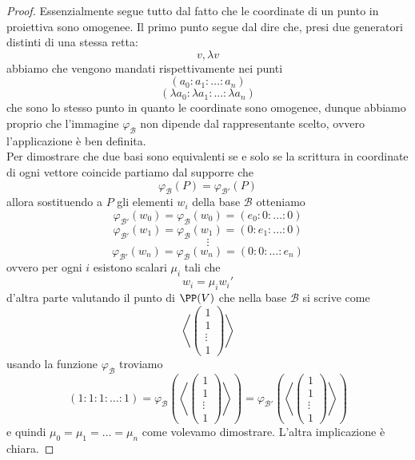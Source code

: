 \documentclass[11pt]{scrartcl}
\begin{document}
   	 \begin{proof}
   	 	Essenzialmente segue tutto dal fatto che le coordinate di un punto in proiettiva sono omogenee. Il primo punto segue dal dire che, presi due generatori distinti di una stessa retta:
   	 	$$v,\lambda v$$
   	 	abbiamo che vengono mandati rispettivamente nei punti
   	 	$$(a_0:a_1:\dots:a_n)$$
   	 	$$\left(\lambda a_0:\lambda a_1:\dots:\lambda a_n\right)$$
   	 	che sono lo stesso punto in quanto le coordinate sono omogenee, dunque abbiamo proprio che l'immagine $\varphi_\mathcal{B}$ non dipende dal rappresentante scelto, ovvero l'applicazione è ben definita. \\
   	 	Per dimostrare che due basi sono equivalenti se e solo se la scrittura in coordinate di ogni vettore coincide partiamo dal supporre che
   	 	$$\varphi_\mathcal{B}(P)=\varphi_{\mathcal{B}'}(P)$$
   	 	allora sostituendo a $P$ gli elementi $w_i$ della base $\mathcal{B}$ otteniamo
   	 	$$\varphi_{\mathcal{B}'}(w_0)=\varphi_{\mathcal{B}}(w_0)=(e_0:0:\dots:0)$$
   	 	$$\varphi_{\mathcal{B}'}(w_1)=\varphi_{\mathcal{B}}(w_1)=(0:e_1:\dots:0)$$
   	 	$$\vdots$$
   	 	$$\varphi_{\mathcal{B}'}(w_n)=\varphi_{\mathcal{B}}(w_n)=(0:0:\dots:e_n)$$
   	 	ovvero per ogni $i$ esistono scalari $\mu_i$ tali che
   	 	$$w_i=\mu_iw_i'$$
   	 	d'altra parte valutando il punto di $\PP(V)$ che nella base $\mathcal{B}$ si scrive come
   	 	$$\left\langle
   	 	\begin{pmatrix}
   	 		1 \\
   	 		1 \\
   	 		\vdots \\
   	 		1
   	 	\end{pmatrix}
   	 	\right\rangle$$ 
   	 	usando la funzione $\varphi_\mathcal{B}$ troviamo
   	 	$$(1:1:1:\dots:1)=\varphi_\mathcal{B}\left(\left\langle
   	 	\begin{pmatrix}
   	 		1 \\
   	 		1 \\
   	 		\vdots \\
   	 		1
   	 	\end{pmatrix}
   	 	\right\rangle\right)=\varphi_{\mathcal{B}'}\left(\left\langle
   	 	\begin{pmatrix}
   	 		1 \\
   	 		1 \\
   	 		\vdots \\
   	 		1
   	 	\end{pmatrix}
   	 	\right\rangle\right)$$
   	 	e quindi $\mu_0=\mu_1=\dots=\mu_n$ come volevamo dimostrare. L'altra implicazione è chiara. 
   	 \end{proof}
\end{document}
